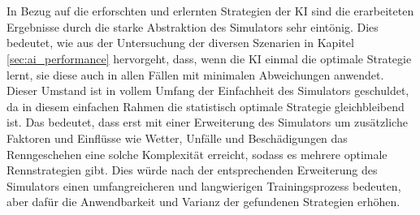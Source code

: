 \\\\
In Bezug auf die erforschten und erlernten Strategien der KI sind die erarbeiteten Ergebnisse durch die starke Abstraktion des Simulators sehr eintönig. Dies bedeutet, wie aus der Untersuchung der diversen Szenarien in Kapitel \ref{sec:ai_performance} hervorgeht, dass, wenn die KI einmal die optimale Strategie lernt, sie diese auch in allen Fällen mit minimalen Abweichungen anwendet. Dieser Umstand ist in vollem Umfang der Einfachheit des Simulators geschuldet, da in diesem einfachen Rahmen die statistisch optimale Strategie gleichbleibend ist. Das bedeutet, dass erst mit einer Erweiterung des Simulators um zusätzliche Faktoren und Einflüsse wie Wetter, Unfälle und Beschädigungen das Renngeschehen eine solche Komplexität erreicht, sodass es mehrere optimale Rennstrategien gibt. Dies würde nach der entsprechenden Erweiterung des Simulators einen umfangreicheren und langwierigen Trainingsprozess bedeuten, aber dafür die Anwendbarkeit und Varianz der gefundenen Strategien erhöhen.